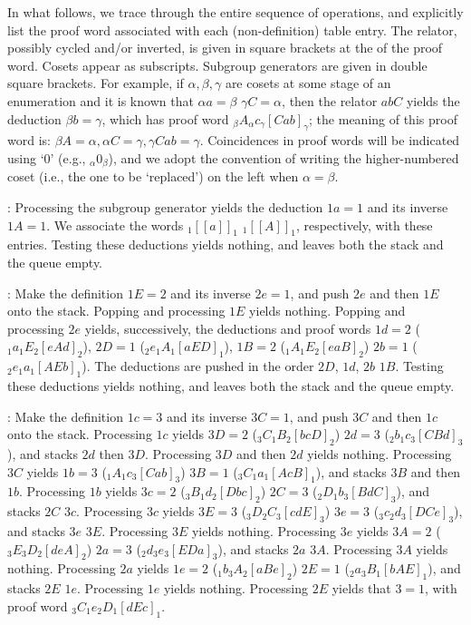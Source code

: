 In what follows, we trace through the entire sequence of operations, and
  explicitly list the proof word associated with each (non-definition)
  table entry.
The relator, possibly cycled and/or inverted, is given in square brackets
  at the  of the proof word.
Cosets appear as subscripts.
Subgroup generators are given in double square brackets.
For example, if $\alpha,\beta,\gamma$ are cosets at some stage of an
  enumeration and it is known that $\alpha a = \beta$ \amp 
  $\gamma C = \alpha$, then the relator $abC$ yields the deduction 
  $\beta b = \gamma$, which has proof word 
  $_{\beta}A_{\alpha}c_{\gamma}[Cab]_{\gamma}$;
  the meaning of this proof word is:
  $\beta A=\alpha, \alpha C=\gamma, \gamma Cab = \gamma$.
Coincidences in proof words will be indicated using `$0$' (e.g., 
  $_\alpha 0_\beta$), and we adopt the convention of writing the 
  higher-numbered coset (i.e., the one to be `replaced') on the left when
  $\alpha = \beta$.

:
Processing the subgroup generator yields the deduction $1a=1$ and its
  inverse $1A=1$.
We associate the words $_1[[a]]_1$ \amp $_1[[A]]_1$, respectively, with
  these entries.
Testing these deductions yields nothing, and leaves both the stack and the
  queue empty.

:
Make the definition $1E=2$ and its inverse $2e=1$, and push $2e$ and then
  $1E$ onto the stack.
Popping and processing $1E$ yields nothing.
Popping and processing $2e$ yields, successively, the deductions and
  proof words $1d=2$ ($_1a_1E_2[eAd]_2$), $2D=1$ ($_2e_1A_1[aED]_1$),
  $1B=2$ ($_1A_1E_2[eaB]_2$) \amp $2b=1$ ($_2e_1a_1[AEb]_1$).
The deductions are pushed in the order $2D$, $1d$, $2b$ \amp $1B$.
Testing these deductions yields nothing, and leaves both the stack and the
  queue empty.

:
Make the definition $1c=3$ and its inverse $3C=1$, and push $3C$ and then
  $1c$ onto the stack.
Processing $1c$ yields $3D=2$ ($_3C_1B_2[bcD]_2$) \amp $2d=3$
  ($_2b_1c_3[CBd]_3$), and stacks $2d$ then $3D$.
Processing $3D$ and then $2d$ yields nothing.
Processing $3C$ yields $1b=3$ ($_1A_1c_3[Cab]_3$) \amp $3B=1$
  ($_3C_1a_1[AcB]_1$), and stacks $3B$ and then $1b$.
Processing $1b$ yields $3c=2$ ($_3B_1d_2[Dbc]_2$) \amp $2C=3$
  ($_2D_1b_3[BdC]_3$), and stacks $2C$ \amp $3c$.
Processing $3c$ yields $3E=3$ ($_3D_2C_3[cdE]_3$) \amp $3e=3$
  ($_3c_2d_3[DCe]_3$), and stacks $3e$ \amp $3E$.
Processing $3E$ yields nothing.
Processing $3e$ yields $3A=2$ ($_3E_3D_2[deA]_2$) \amp $2a=3$
  ($_2d_3e_3[EDa]_3$), and stacks $2a$ \amp $3A$.
Processing $3A$ yields nothing.
Processing $2a$ yields $1e=2$ ($_1b_3A_2[aBe]_2$) \amp $2E=1$
  ($_2a_3B_1[bAE]_1$), and stacks $2E$ \amp $1e$.
Processing $1e$ yields nothing.
Processing $2E$ yields that $3=1$, with proof word $_3C_1e_2D_1[dEc]_1$.

